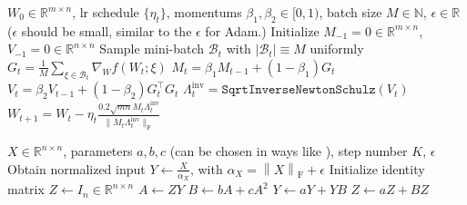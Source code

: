\documentclass{article}
\theoremstyle{remark}
\newcommand{\Norm}[1]{\left\|#1\right\|}
\newcommand{\Abs}[1]{\left\vert #1 \right\vert}
\newcommand{\cB}{\mathcal{B}}
\newcommand{\RR}{\mathbb{R}}
\begin{document}
\begin{algorithm}[th]
   \caption{A Practical Implementation of ASGO (for a layer $W^\ell \in \RR^{m\times n}$ such that $m \ge n$)}
   \label{alg:practical_asgo}
\begin{algorithmic}[1]
    $W_0\in \RR^{m\times n}$, lr schedule $\{\eta_t\}$, momentums $\beta_1,\beta_2 \in [0,1)$, batch size $M\in \mathbb{N}$, $\epsilon \in \RR$ ($\epsilon$ should be small, similar to the $\epsilon$ for Adam.)
   \STATE Initialize $M_{-1} = 0 \in \RR^{m\times n}$, $V_{-1}=0 \in \RR^{n\times n}$
   \COMMENT{If $m < n$, then we set $V_{-1}=0 \in \RR^{m\times m}$}
   \STATE Sample mini-batch $\cB_t$ with $\Abs{\cB_t} \equiv M$ uniformly
   \STATE $G_t = \frac{1}{M} \sum_{\xi\in\cB_t} \nabla_W f(W_t;\xi)$
   \STATE $M_t = \beta_1 M_{t-1} + (1 - \beta_1)G_t$
   \STATE $V_t = \beta_2 V_{t-1} + (1 - \beta_2) G_t^\top G_t$
   \STATE $\Lambda_t^{\mathrm{inv}} = \texttt{SqrtInverseNewtonSchulz}(V_t)$
   \STATE $W_{t+1} = W_t - \eta_t \frac{0.2 \sqrt{mn}  M_t \Lambda_t^{\mathrm{inv}}}{\|M_t \Lambda_t^{\mathrm{inv}}\|_{\mathrm{F}}}$
   \ENDFOR
\end{algorithmic}
\end{algorithm}


\begin{algorithm}[th]
   \caption{SqrtInverseNewtonSchulz}
   \label{alg:sqrt-inverse-newton-schulz}
\begin{algorithmic}[1]
    $X \in \RR^{n\times n}$, parameters $a,b,c$ (can be chosen in ways like \citet{jordan2024muon,amsel2025polar,grishina2025accelerating}), step number $K$, $\epsilon$
   \STATE Obtain normalized input $Y \gets \frac{X}{\alpha_X}$, with $\alpha_X = \Norm{X}_{\mathrm{F}}  + \epsilon$
   \STATE Initialize identity matrix $Z \gets I_n \in \RR^{n\times n}$
   \STATE $A \gets ZY$
   \STATE $B \gets bA + cA^2$
   \STATE $Y \gets aY + YB$
   \STATE $Z \gets aZ +BZ$
   \ENDFOR
\end{algorithmic}
\end{algorithm}
\end{document}
